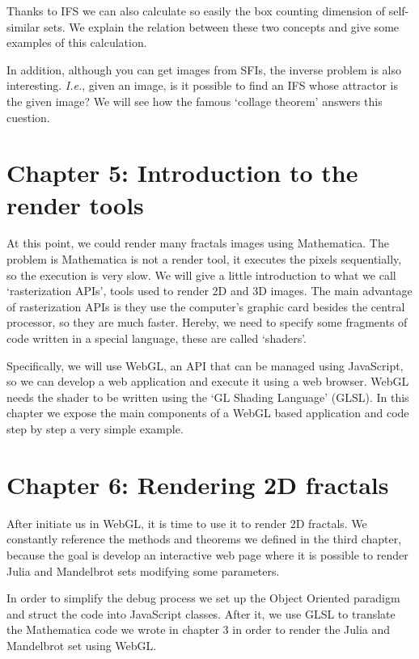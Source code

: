 Thanks to IFS we can also calculate so easily the box counting dimension of self-similar sets. We explain the relation between these two concepts and give some examples of this calculation.

In addition, although you can get images from SFIs, the inverse problem is also interesting. \textit{I.e.}, given an image, is it possible to find an IFS whose attractor is the given image? We will see how the famous `collage theorem' answers this cuestion.

\section*{Chapter 5: Introduction to the render tools}

At this point, we could render many fractals images using Mathematica. The problem is Mathematica is not a render tool, it executes the pixels sequentially, so the execution is very slow. We will give a little introduction to what we call `rasterization APIs', tools used to render 2D and 3D images. The main advantage of rasterization APIs is they use the computer's graphic card besides the central processor, so they are much faster. Hereby, we need to specify some fragments of code written in a special language, these are called `shaders'. 

Specifically, we will use WebGL, an API that can be managed using JavaScript, so we can develop a web application and execute it using a web browser. WebGL needs the shader to be written using the `GL Shading Language' (GLSL). In this chapter we expose the main components of a WebGL based application and code step by step a very simple example.

\section*{Chapter 6: Rendering 2D fractals}

After initiate us in WebGL, it is time to use it to render 2D fractals. We constantly reference the methods and theorems we defined in the third chapter, because the goal is develop an interactive web page where it is possible to render Julia and Mandelbrot sets modifying some parameters.

In order to simplify the debug process we set up the Object Oriented paradigm and struct the code into JavaScript classes. After it, we use GLSL to translate the Mathematica code we wrote in chapter 3 in order to render the Julia and Mandelbrot set using WebGL.

